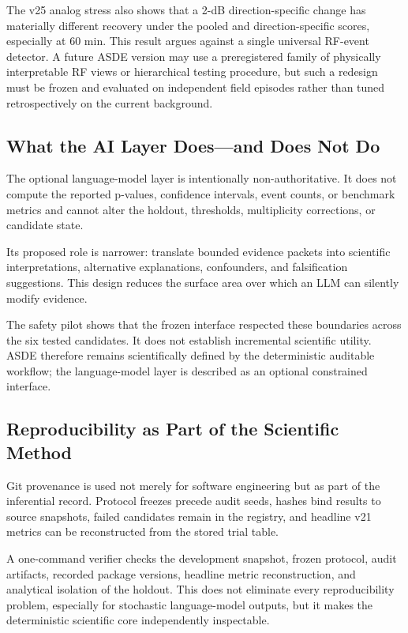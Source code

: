 \documentclass{ieeeaccess}
\begin{document}
The v25 analog stress also shows that a 2-dB direction-specific change has materially different recovery under the pooled and direction-specific scores, especially at 60 min. This result argues against a single universal RF-event detector. A future ASDE version may use a preregistered family of physically interpretable RF views or hierarchical testing procedure, but such a redesign must be frozen and evaluated on independent field episodes rather than tuned retrospectively on the current background.

\subsection{What the AI Layer Does---and Does Not Do}\label{what-the-ai-layer-doesand-does-not-do}

The optional language-model layer is intentionally non-authoritative. It does not compute the reported p-values, confidence intervals, event counts, or benchmark metrics and cannot alter the holdout, thresholds, multiplicity corrections, or candidate state.

Its proposed role is narrower: translate bounded evidence packets into scientific interpretations, alternative explanations, confounders, and falsification suggestions. This design reduces the surface area over which an LLM can silently modify evidence.

The safety pilot shows that the frozen interface respected these boundaries across the six tested candidates. It does not establish incremental scientific utility. ASDE therefore remains scientifically defined by the deterministic auditable workflow; the language-model layer is described as an optional constrained interface.

\subsection{Reproducibility as Part of the Scientific Method}\label{reproducibility-as-part-of-the-scientific-method}

Git provenance is used not merely for software engineering but as part of the inferential record. Protocol freezes precede audit seeds, hashes bind results to source snapshots, failed candidates remain in the registry, and headline v21 metrics can be reconstructed from the stored trial table.

A one-command verifier checks the development snapshot, frozen protocol, audit artifacts, recorded package versions, headline metric reconstruction, and analytical isolation of the holdout. This does not eliminate every reproducibility problem, especially for stochastic language-model outputs, but it makes the deterministic scientific core independently inspectable.
\end{document}

